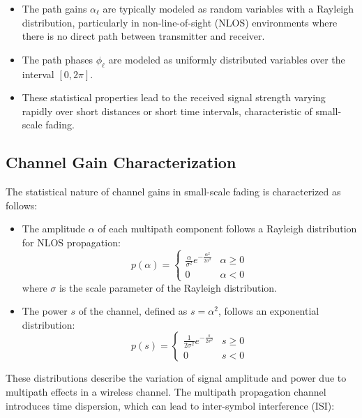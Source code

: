 \begin{itemize}
    \item The path gains \( \alpha_{\ell} \) are typically modeled as random variables with a Rayleigh distribution, particularly in non-line-of-sight (NLOS) environments where there is no direct path between transmitter and receiver.
    \item The path phases \( \phi_{\ell} \) are modeled as uniformly distributed variables over the interval \( [0,2\pi] \).
    \item These statistical properties lead to the received signal strength varying rapidly over short distances or short time intervals, characteristic of small-scale fading.
\end{itemize}







\subsection*{Channel Gain Characterization}

The statistical nature of channel gains in small-scale fading is characterized as follows:

\begin{itemize}
    \item The amplitude \( \alpha \) of each multipath component follows a Rayleigh distribution for NLOS propagation:
    \[
    p(\alpha) = \begin{cases} 
    \frac{\alpha}{\sigma^2} e^{-\frac{\alpha^2}{2\sigma^2}} & \alpha \geq 0 \\
    0 & \alpha < 0
    \end{cases}
    \]
    where \( \sigma \) is the scale parameter of the Rayleigh distribution.

    \item The power \( s \) of the channel, defined as \( s = \alpha^2 \), follows an exponential distribution:
    \[
    p(s) = \begin{cases} 
    \frac{1}{2\sigma^2} e^{-\frac{s}{2\sigma^2}} & s \geq 0 \\
    0 & s < 0
    \end{cases}
    \]
\end{itemize}

These distributions describe the variation of signal amplitude and power due to multipath effects in a wireless channel.
The multipath propagation channel introduces time dispersion, which can lead to inter-symbol interference (ISI):

